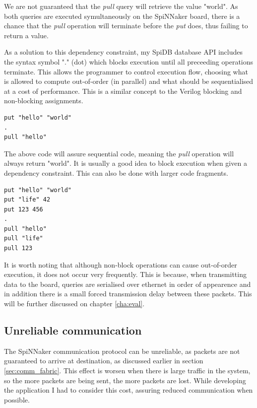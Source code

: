 We are not guaranteed that the \textit{pull} query will retrieve the value "world". As both queries are executed symultaneously on the SpiNNaker board, there is a chance that the \textit{pull} operation will terminate before the \textit{put} does, thus failing to return a value.

As a solution to this dependency constraint, my SpiDB database API includes the syntax symbol "." (dot) which blocks execution until all preceeding operations terminate. This allows the programmer to control execution flow, choosing what is allowed to compute out-of-order (in parallel) and what should be sequentialised at a cost of performance. This is a similar concept to the Verilog blocking and non-blocking assignments.

\begin{lstlisting}[caption={Blocking execution}, label=list:blocking1]
put "hello" "world"
.
pull "hello"
\end{lstlisting}

The above code will assure sequential code, meaning the \textit{pull} operation will always return "world". It is usually a good idea to block execution when given a dependency constraint. This can also be done with larger code fragments.

\begin{lstlisting}[caption={Blocking execution}, label=list:blocking2]
put "hello" "world"
put "life" 42
put 123 456
.
pull "hello"
pull "life"
pull 123
\end{lstlisting}

It is worth noting that although non-block operations can cause out-of-order execution, it does not occur very frequently. This is because, when transmitting data to the board, queries are serialised over ethernet in order of appearence and in addition there is a small forced transmission delay between these packets. This will be further discussed on chapter \ref{cha:eval}.

\subsection{Unreliable communication}
\label{sec:unreliable_comm}

The SpiNNaker communication protocol can be unreliable, as packets are not guaranteed to arrive at destination, as discussed earlier in section \ref{sec:comm_fabric}. This effect is worsen when there is large traffic in the system, so the more packets are being sent, the more packets are lost. While developing the application I had to consider this cost, assuring reduced communication when possible. 

